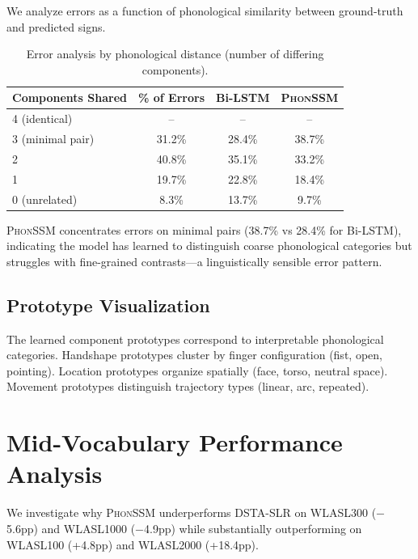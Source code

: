 \documentclass{article}
\theoremstyle{definition}
\theoremstyle{remark}
\newcommand{\phonssm}{\textsc{PhonSSM}}
\begin{document}
We analyze errors as a function of phonological similarity between ground-truth and predicted signs.

\begin{table}[ht]
\caption{Error analysis by phonological distance (number of differing components).}
\label{tab:error_distance}
\vspace{-1mm}
\begin{center}
\begin{small}
\begin{tabular*}{\columnwidth}{@{\extracolsep{\fill}}lccc@{}}
\toprule
Components Shared & \% of Errors & Bi-LSTM & \phonssm{} \\
\midrule
4 (identical) & -- & -- & -- \\
3 (minimal pair) & 31.2\% & 28.4\% & 38.7\% \\
2 & 40.8\% & 35.1\% & 33.2\% \\
1 & 19.7\% & 22.8\% & 18.4\% \\
0 (unrelated) & 8.3\% & 13.7\% & 9.7\% \\
\bottomrule
\end{tabular*}
\end{small}
\end{center}
\vspace{-2mm}
\end{table}

\phonssm{} concentrates errors on minimal pairs (38.7\% vs 28.4\% for Bi-LSTM), indicating the model has learned to distinguish coarse phonological categories but struggles with fine-grained contrasts---a linguistically sensible error pattern.

\subsection{Prototype Visualization}

The learned component prototypes correspond to interpretable phonological categories. Handshape prototypes cluster by finger configuration (fist, open, pointing). Location prototypes organize spatially (face, torso, neutral space). Movement prototypes distinguish trajectory types (linear, arc, repeated).

\section{Mid-Vocabulary Performance Analysis}
\label{app:midvocab}

We investigate why \phonssm{} underperforms DSTA-SLR on WLASL300 ($-$5.6pp) and WLASL1000 ($-$4.9pp) while substantially outperforming on WLASL100 (+4.8pp) and WLASL2000 (+18.4pp).
\end{document}
